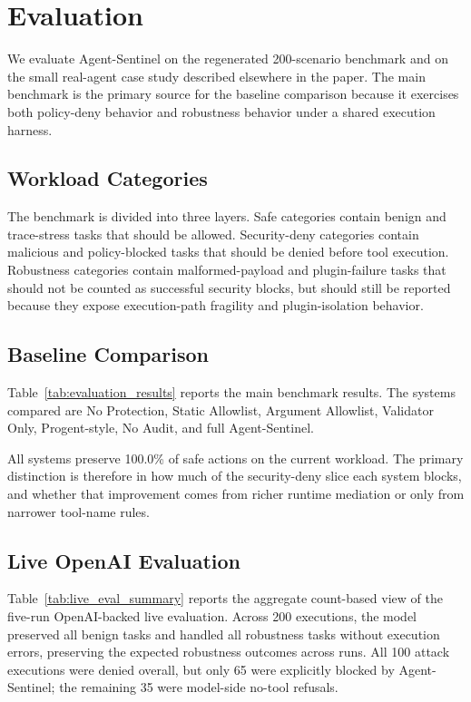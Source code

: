 \section{Evaluation}

We evaluate Agent-Sentinel on the regenerated 200-scenario benchmark and on the small real-agent case study described elsewhere in the paper. The main benchmark is the primary source for the baseline comparison because it exercises both policy-deny behavior and robustness behavior under a shared execution harness.

\subsection{Workload Categories}

The benchmark is divided into three layers. Safe categories contain benign and trace-stress tasks that should be allowed. Security-deny categories contain malicious and policy-blocked tasks that should be denied before tool execution. Robustness categories contain malformed-payload and plugin-failure tasks that should not be counted as successful security blocks, but should still be reported because they expose execution-path fragility and plugin-isolation behavior.

\subsection{Baseline Comparison}

Table~\ref{tab:evaluation_results} reports the main benchmark results. The systems compared are No Protection, Static Allowlist, Argument Allowlist, Validator Only, Progent-style, No Audit, and full Agent-Sentinel.



All systems preserve 100.0\% of safe actions on the current workload. The primary distinction is therefore in how much of the security-deny slice each system blocks, and whether that improvement comes from richer runtime mediation or only from narrower tool-name rules.

\subsection{Live OpenAI Evaluation}

Table~\ref{tab:live_eval_summary} reports the aggregate count-based view of the five-run OpenAI-backed live evaluation. Across 200 executions, the model preserved all benign tasks and handled all robustness tasks without execution errors, preserving the expected robustness outcomes across runs. All 100 attack executions were denied overall, but only 65 were explicitly blocked by Agent-Sentinel; the remaining 35 were model-side no-tool refusals.

